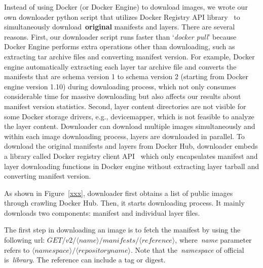 Instead of using Docker (or Docker Engine) to download images, we wrote our own downloader python script that utilizes Docker Registry API library~\cite{XXX} to simultaneously download~\textbf{original} manifests and layers.
%
%
%
There are several reasons.
%
First, our downloader script runs faster than `\textit{docker pull}' because Docker Engine performs extra operations other than downloading, such as extracting tar archive files and converting manifest version. 
%
For example, Docker engine automatically extracting each layer tar archive file and converts the manifests that are schema version 1 to schema version 2 (starting from Docker engine version 1.10) during downloading process, which not only consumes considerable time for massive downloading but also affects our results about manifest version statistics.
%
Second, layer content directories are not visible for some Docker storage drivers, e.g., devicemapper, which is not feasible to analyze the layer content. 
%
%
Downloader can download multiple images simultaneously and within each image downloading process, layers are downloaded in parallel.
%
To download the original manifests and layers from Docker Hub, downloader embeds a library called Docker registry client API~\cite{xxx} which only encapsulates manifest and layer downloading functions in Docker engine without extracting layer tarball and converting manifest version. 
%
%




%
As shown in Figure~\ref{xxx}, downloader first obtains a list of public images through crawling Docker Hub.
%
Then, it starts downloading process.
%
It mainly downloads two components: manifest and individual layer files. 



The first step in downloading an image is to fetch the manifest by using the following url: $GET /v2/\langle name \rangle/manifests/\langle reference \rangle$, where~\textit{name} parameter refers to $\langle namespace\rangle/\langle repository name \rangle$.
%
Note that the~\textit{namespace} of official is~\textit{library}.
%
The reference can include a tag or digest.
%
%



